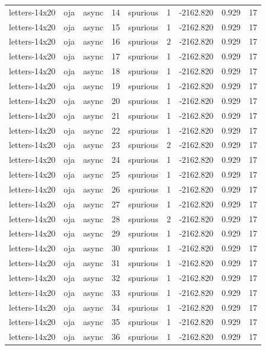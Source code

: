 \begin{tabular}{lllrlrrrr}
letters-14x20 & oja & async & 14 & spurious & 1 & -2162.820 & 0.929 & 17 \\
letters-14x20 & oja & async & 15 & spurious & 1 & -2162.820 & 0.929 & 17 \\
letters-14x20 & oja & async & 16 & spurious & 2 & -2162.820 & 0.929 & 17 \\
letters-14x20 & oja & async & 17 & spurious & 1 & -2162.820 & 0.929 & 17 \\
letters-14x20 & oja & async & 18 & spurious & 1 & -2162.820 & 0.929 & 17 \\
letters-14x20 & oja & async & 19 & spurious & 1 & -2162.820 & 0.929 & 17 \\
letters-14x20 & oja & async & 20 & spurious & 1 & -2162.820 & 0.929 & 17 \\
letters-14x20 & oja & async & 21 & spurious & 1 & -2162.820 & 0.929 & 17 \\
letters-14x20 & oja & async & 22 & spurious & 1 & -2162.820 & 0.929 & 17 \\
letters-14x20 & oja & async & 23 & spurious & 2 & -2162.820 & 0.929 & 17 \\
letters-14x20 & oja & async & 24 & spurious & 1 & -2162.820 & 0.929 & 17 \\
letters-14x20 & oja & async & 25 & spurious & 1 & -2162.820 & 0.929 & 17 \\
letters-14x20 & oja & async & 26 & spurious & 1 & -2162.820 & 0.929 & 17 \\
letters-14x20 & oja & async & 27 & spurious & 1 & -2162.820 & 0.929 & 17 \\
letters-14x20 & oja & async & 28 & spurious & 2 & -2162.820 & 0.929 & 17 \\
letters-14x20 & oja & async & 29 & spurious & 1 & -2162.820 & 0.929 & 17 \\
letters-14x20 & oja & async & 30 & spurious & 1 & -2162.820 & 0.929 & 17 \\
letters-14x20 & oja & async & 31 & spurious & 1 & -2162.820 & 0.929 & 17 \\
letters-14x20 & oja & async & 32 & spurious & 1 & -2162.820 & 0.929 & 17 \\
letters-14x20 & oja & async & 33 & spurious & 1 & -2162.820 & 0.929 & 17 \\
letters-14x20 & oja & async & 34 & spurious & 1 & -2162.820 & 0.929 & 17 \\
letters-14x20 & oja & async & 35 & spurious & 1 & -2162.820 & 0.929 & 17 \\
letters-14x20 & oja & async & 36 & spurious & 1 & -2162.820 & 0.929 & 17 \\

\end{tabular}
